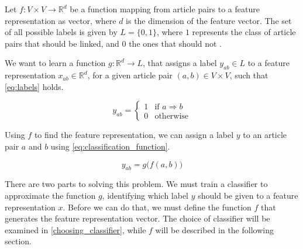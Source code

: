 
Let $f: V\times V \to \mathbb{R}^d$ be a function mapping from article pairs to a feature representation as vector, where $d$ is the dimension of the feature vector. The set of all possible labels is given by $L=\{0,1\}$, where $1$ represents the class of article pairs that should be linked, and $0$ the ones that should not .

We want to learn a function $g: \mathbb{R}^d \to L$, that assigns a label $y_{ab} \in L$ to a feature representation $x_{ab} \in \mathbb{R}^d$, for a given article pair $(a,b) \in V \times V$, such that \cref{eq:labels} holds.

\begin{equation}
\label{eq:labels}
    y_{ab}=
    \begin{cases}
        1 & \text{if } a \Rightarrow b\\
        0 & \text{otherwise}
    \end{cases}
\end{equation}

Using $f$ to find the feature representation, we can assign a label $y$ to an article pair $a$ and $b$ using \cref{eq:classification_function}.

\begin{equation}
\label{eq:classification_function}
  y_{ab} = g\big(f(a,b)\big)
\end{equation}

There are two parts to solving this problem. We must train a classifier to approximate the function $g$, identifying which label $y$ should be given to a feature representation $x$. Before we can do that, we must define the function $f$ that generates the feature representation vector. The choice of classifier will be examined in \cref{choosing_classifier}, while $f$ will be described in the following section.



